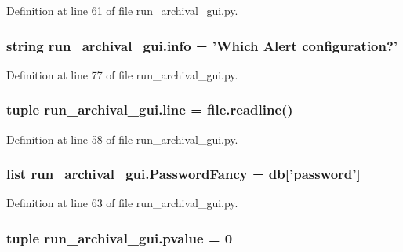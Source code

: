 Definition at line 61 of file run\-\_\-archival\-\_\-gui.\-py.

\hypertarget{namespacerun__archival__gui_ad1643ab4eafe2c9327907387e49d1763}{
\subsubsection[{info}]{\setlength{\rightskip}{0pt plus 5cm}string run\-\_\-archival\-\_\-gui.\-info = 'Which {\bf Alert} configuration?'}}\label{namespacerun__archival__gui_ad1643ab4eafe2c9327907387e49d1763}


Definition at line 77 of file run\-\_\-archival\-\_\-gui.\-py.

\hypertarget{namespacerun__archival__gui_a3008707290c47efb54081330e99bd7f4}{
\subsubsection[{line}]{\setlength{\rightskip}{0pt plus 5cm}tuple run\-\_\-archival\-\_\-gui.\-line = file.\-readline()}}\label{namespacerun__archival__gui_a3008707290c47efb54081330e99bd7f4}


Definition at line 58 of file run\-\_\-archival\-\_\-gui.\-py.

\hypertarget{namespacerun__archival__gui_a6ff13b2dcf15748288e82dc02c7f189d}{
\subsubsection[{Password\-Fancy}]{\setlength{\rightskip}{0pt plus 5cm}list run\-\_\-archival\-\_\-gui.\-Password\-Fancy = {\bf db}\mbox{[}'password'\mbox{]}}}\label{namespacerun__archival__gui_a6ff13b2dcf15748288e82dc02c7f189d}


Definition at line 63 of file run\-\_\-archival\-\_\-gui.\-py.

\hypertarget{namespacerun__archival__gui_a3316510dcd59d172ae55c2f37998d130}{
\subsubsection[{pvalue}]{\setlength{\rightskip}{0pt plus 5cm}tuple run\-\_\-archival\-\_\-gui.\-pvalue = 0}}\label{namespacerun__archival__gui_a3316510dcd59d172ae55c2f37998d130}


